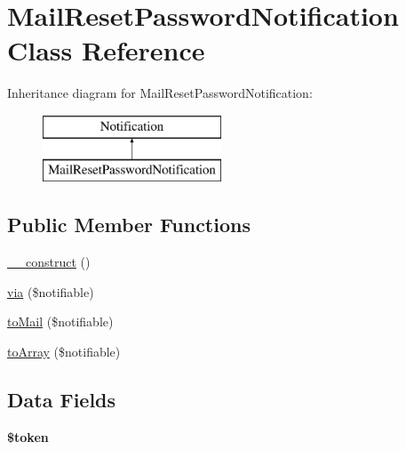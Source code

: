 \hypertarget{class_app_1_1_notifications_1_1_mail_reset_password_notification}{}\section{Mail\+Reset\+Password\+Notification Class Reference}
\label{class_app_1_1_notifications_1_1_mail_reset_password_notification}
Inheritance diagram for Mail\+Reset\+Password\+Notification\+:\begin{figure}[H]
\begin{center}
\leavevmode
\includegraphics[height=2.000000cm]{class_app_1_1_notifications_1_1_mail_reset_password_notification}
\end{center}
\end{figure}
\subsection*{Public Member Functions}
\begin{DoxyCompactItemize}
\item 
\mbox{\hyperlink{class_app_1_1_notifications_1_1_mail_reset_password_notification_a095c5d389db211932136b53f25f39685}{\+\_\+\+\_\+construct}} ()
\item 
\mbox{\hyperlink{class_app_1_1_notifications_1_1_mail_reset_password_notification_a7665d00e051513872f2076af10c7af8d}{via}} (\$notifiable)
\item 
\mbox{\hyperlink{class_app_1_1_notifications_1_1_mail_reset_password_notification_a75c594a393d504ccb48e8eb0c93f5f37}{to\+Mail}} (\$notifiable)
\item 
\mbox{\hyperlink{class_app_1_1_notifications_1_1_mail_reset_password_notification_a6107f43996f15dc204b173e034aee6c8}{to\+Array}} (\$notifiable)
\end{DoxyCompactItemize}
\subsection*{Data Fields}
\begin{DoxyCompactItemize}
\item 
\mbox{\label{class_app_1_1_notifications_1_1_mail_reset_password_notification_a00ae4fcafb1145f5e968bdf920f83e2e}} 
{\bfseries \$token}
\end{DoxyCompactItemize}


